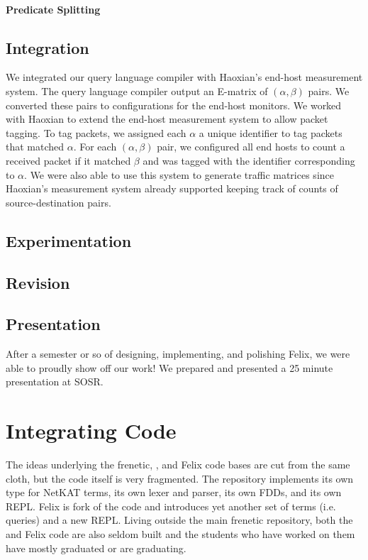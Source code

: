 \paragraph{Predicate Splitting}

\subsection{Integration}
We integrated our query language compiler with Haoxian's end-host measurement
system. The query language compiler output an E-matrix of $(\alpha, \beta)$
pairs. We converted these pairs to configurations for the end-host monitors. We
worked with Haoxian to extend the end-host measurement system to allow packet
tagging. To tag packets, we assigned each $\alpha$ a unique identifier to tag
packets that matched $\alpha$. For each $(\alpha, \beta)$ pair, we configured
all end hosts to count a received packet if it matched $\beta$ and was tagged
with the identifier corresponding to $\alpha$.  We were also able to use this
system to generate traffic matrices since Haoxian's measurement system already
supported keeping track of counts of source-destination pairs.

\subsection{Experimentation}

\subsection{Revision}

\subsection{Presentation}
After a semester or so of designing, implementing, and polishing Felix, we were
able to proudly show off our work! We prepared and presented a 25 minute
presentation at SOSR.

\section{Integrating Code}
The ideas underlying the frenetic, \netauto{}, and Felix code bases are cut
from the same cloth, but the code itself is very fragmented. The \netauto{}
repository implements its own type for NetKAT terms, its own lexer and parser,
its own FDDs, and its own REPL. Felix is fork of the \netauto{} code and
introduces yet another set of terms (i.e. queries) and a new REPL. Living
outside the main frenetic repository, both the \netauto{} and Felix code are
also seldom built and the students who have worked on them have mostly
graduated or are graduating.

